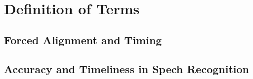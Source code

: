\chapter{Definition of Terms}
\label{chap:terms}
 \section {Forced Alignment and Timing} 
  \section {Accuracy and Timeliness in Spech Recognition} 
 